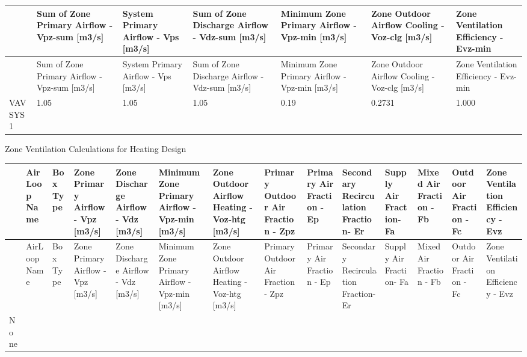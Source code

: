 {\scriptsize
\begin{longtable}[c]{>{\raggedright}p{0.85in}>{\raggedright}p{0.85in}>{\raggedright}p{0.85in}>{\raggedright}p{0.85in}>{\raggedright}p{0.85in}>{\raggedright}p{0.85in}>{\raggedright}p{0.85in}}
\toprule
 & Sum of Zone Primary Airflow - Vpz-sum [m3/s] & System Primary Airflow - Vps [m3/s] & Sum of Zone Discharge Airflow - Vdz-sum [m3/s] & Minimum Zone Primary Airflow - Vpz-min [m3/s] & Zone Outdoor Airflow Cooling - Voz-clg [m3/s] & Zone Ventilation Efficiency - Evz-min \tabularnewline
\midrule
\endfirsthead

\toprule
 & Sum of Zone Primary Airflow - Vpz-sum [m3/s] & System Primary Airflow - Vps [m3/s] & Sum of Zone Discharge Airflow - Vdz-sum [m3/s] & Minimum Zone Primary Airflow - Vpz-min [m3/s] & Zone Outdoor Airflow Cooling - Voz-clg [m3/s] & Zone Ventilation Efficiency - Evz-min \tabularnewline
\midrule
\endhead

VAV SYS 1 & 1.05 & 1.05 & 1.05 & 0.19 & 0.2731 & 1.000 \tabularnewline
\bottomrule
\end{longtable}}

Zone Ventilation Calculations for Heating Design

{\scriptsize
\begin{longtable}[c]{>{\raggedright}p{0.42in}>{\raggedright}p{0.42in}>{\raggedright}p{0.42in}>{\raggedright}p{0.42in}>{\raggedright}p{0.42in}>{\raggedright}p{0.42in}>{\raggedright}p{0.42in}>{\raggedright}p{0.42in}>{\raggedright}p{0.42in}>{\raggedright}p{0.42in}>{\raggedright}p{0.42in}>{\raggedright}p{0.42in}>{\raggedright}p{0.42in}>{\raggedright}p{0.42in}}
\toprule
 & AirLoop Name & Box Type & Zone Primary Airflow - Vpz [m3/s] & Zone Discharge Airflow - Vdz [m3/s] & Minimum Zone Primary Airflow - Vpz-min [m3/s] & Zone Outdoor Airflow Heating - Voz-htg [m3/s] & Primary Outdoor Air Fraction - Zpz & Primary Air Fraction - Ep & Secondary Recirculation Fraction- Er & Supply Air Fraction- Fa & Mixed Air Fraction - Fb & Outdoor Air Fraction - Fc & Zone Ventilation Efficiency - Evz \tabularnewline
\midrule
\endfirsthead

\toprule
 & AirLoop Name & Box Type & Zone Primary Airflow - Vpz [m3/s] & Zone Discharge Airflow - Vdz [m3/s] & Minimum Zone Primary Airflow - Vpz-min [m3/s] & Zone Outdoor Airflow Heating - Voz-htg [m3/s] & Primary Outdoor Air Fraction - Zpz & Primary Air Fraction - Ep & Secondary Recirculation Fraction- Er & Supply Air Fraction- Fa & Mixed Air Fraction - Fb & Outdoor Air Fraction - Fc & Zone Ventilation Efficiency - Evz \tabularnewline
\midrule
\endhead

None & ~ & ~ & ~ & ~ & ~ & ~ & ~ & ~ & ~ & ~ & ~ & ~ & ~ \tabularnewline
\bottomrule
\end{longtable}}

